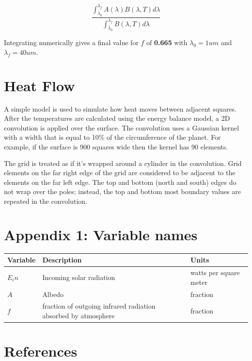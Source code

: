 \documentclass[12pt]{article} %
\begin{document}
$$\frac{\int_{\lambda_0}^{\lambda_f} A(\lambda) B(\lambda, T) d\lambda}{\int_{\lambda_0}^{\lambda_f} B(\lambda, T) d\lambda }$$

Integrating numerically gives a final value for $f$ of \textbf{0.665} with $\lambda_0 = 1um$ and $\lambda_f = 40 um$.

\newpage
\section{Heat Flow}
\label{sec:heatflow}

A simple model is used to simulate how heat moves between adjacent squares. After the temperatures are calculated using the energy balance model, a 2D convolution is applied over the surface. The convolution uses a Gaussian kernel with a width that is equal to 10\% of the circumference of the planet. For example, if the surface is 900 squares wide then the kernel has 90 elements.

The grid is treated as if it's wrapped around a cylinder in the convolution. Grid elements on the far right edge of the grid are considered to be adjacent to the elements on the far left edge. The top and bottom (north and south) edges do not wrap over the poles; instead, the top and bottom most boundary values are repeated in the convolution.

\newpage
\section{Appendix 1: Variable names}

\begin{center}
\begin{tabular}{|m{2 cm}| m{6 cm}| m{6 cm}|} \hline
\textbf{Variable} & \textbf{Description} & \textbf{Units}\\ \hline
$E_in$ & Incoming solar radiation & watts per square meter\\ \hline
$A$ & Albedo & fraction\\ \hline
$f$  & fraction of outgoing infrared radiation absorbed by atmosphere & fraction \\ \hline
\end{tabular}
\end{center}


\newpage
\section{References}
\label{sec:references}
\end{document}
